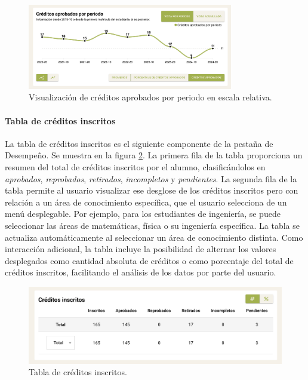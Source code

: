 \begin{enumerate}
	      \begin{figure}[H]
		      \centering
		      \includegraphics[width=0.8\textwidth]{assets/nes/creditos_periodo_relativo.png}
		      \caption{Visualización de créditos aprobados por periodo en escala relativa.}
		      \label{fig:creditos_periodo_relativo}
	      \end{figure}
\end{enumerate}

\paragraph{Tabla de créditos inscritos} La tabla de créditos inscritos es el siguiente componente de la pestaña de Desempeño. Se muestra en la figura \ref{fig:tabla_creditos}. La primera fila de la tabla proporciona un resumen del total de créditos inscritos por el alumno, clasificándolos en \textit{aprobados}, \textit{reprobados}, \textit{retirados}, \textit{incompletos} y \textit{pendientes}. La segunda fila de la tabla permite al usuario visualizar ese desglose de los créditos inscritos pero con relación a un área de conocimiento específica, que el usuario selecciona de un menú desplegable. Por ejemplo, para los estudiantes de ingeniería, se puede seleccionar las áreas de matemáticas, física o su ingeniería específica. La tabla se actualiza automáticamente al seleccionar un área de conocimiento distinta. Como interacción adicional, la tabla incluye la posibilidad de alternar los valores desplegados como  cantidad absoluta de créditos o como porcentaje del total de créditos inscritos, facilitando el análisis de los datos por parte del usuario.

\begin{figure}[H]
	\centering
	\includegraphics[width=\textwidth]{assets/nes/tabla_creditos.png}
	\caption{Tabla de créditos inscritos.}
	\label{fig:tabla_creditos}
\end{figure}

